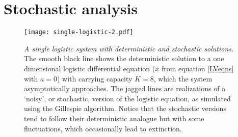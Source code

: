 \section{Stochastic analysis}

\begin{figure}[h]
	\centering
	\texttt{[image: single-logistic-2.pdf]}
	\caption{\emph{A single logistic system with deterministic and stochastic solutions.} The smooth black line shows the deterministic solution to a one dimensional logistic differential equation ($x$ from equation \ref{LVeqns} with $a=0$) with carrying capacity $K=8$, which the system asymptotically approaches. The jagged lines are realizations of a `noisy', or stochastic, version of the logistic equation, as simulated using the Gillespie algorithm. Notice that the stochastic versions tend to follow their deterministic analogue but with some fluctuations, which occasionally lead to extinction. }%
	\label{singlelogfig}
\end{figure}

